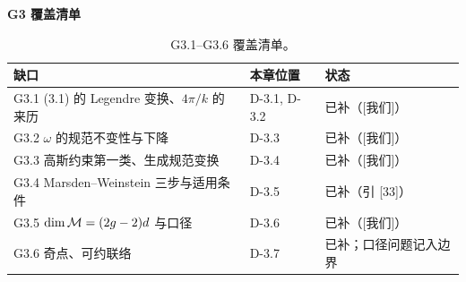 \noindent\textbf{G3 覆盖清单}
\begin{table}[htbp]
\centering
\small
\setlength{\tabcolsep}{4pt}
\begin{tabular}{@{}lll@{}}
\toprule
缺口 & 本章位置 & 状态 \\
\midrule
G3.1 (3.1) 的 Legendre 变换、$4\pi/k$ 的来历 & D-3.1, D-3.2 & 已补（[我们]）\\
G3.2 $\omega$ 的规范不变性与下降 & D-3.3 & 已补（[我们]）\\
G3.3 高斯约束第一类、生成规范变换 & D-3.4 & 已补（[我们]）\\
G3.4 Marsden--Weinstein 三步与适用条件 & D-3.5 & 已补（引 [33]）\\
G3.5 $\dim\mathcal{M}=(2g-2)d$ 与口径 & D-3.6 & 已补（[我们]）\\
G3.6 奇点、可约联络 & D-3.7 & 已补；口径问题记入边界\\
\bottomrule
\end{tabular}
\caption{G3.1--G3.6 覆盖清单。}
\end{table}

